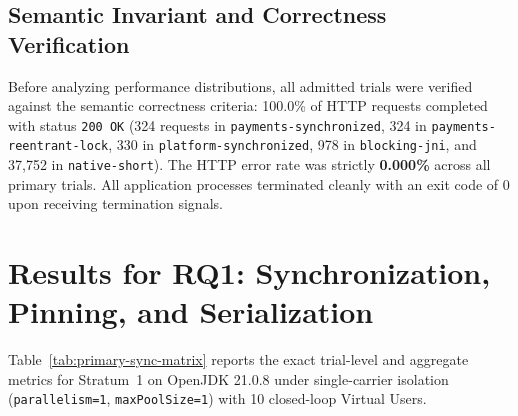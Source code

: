 \subsection{Semantic Invariant and Correctness Verification}
Before analyzing performance distributions, all admitted trials were verified against the semantic correctness criteria: 100.0\% of HTTP requests completed with status \texttt{200 OK} (324 requests in \texttt{payments-synchronized}, 324 in \texttt{payments-reentrant-lock}, 330 in \texttt{platform-synchronized}, 978 in \texttt{blocking-jni}, and 37,752 in \texttt{native-short}). The HTTP error rate was strictly \textbf{0.000\%} across all primary trials. All application processes terminated cleanly with an exit code of 0 upon receiving termination signals.

\section{Results for RQ1: Synchronization, Pinning, and Serialization}
\label{sec:results-rq1}

Table~\ref{tab:primary-sync-matrix} reports the exact trial-level and aggregate metrics for Stratum~1 on OpenJDK 21.0.8 under single-carrier isolation (\texttt{parallelism=1}, \texttt{maxPoolSize=1}) with 10 closed-loop Virtual Users.

